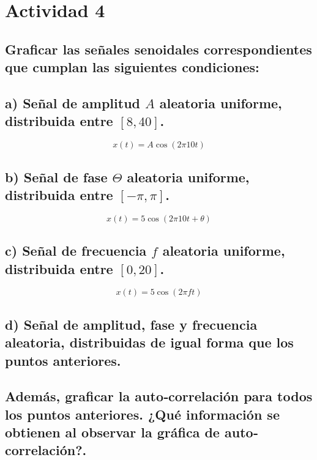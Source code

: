 \section{Actividad 4}

\subsection*{Graficar las señales senoidales correspondientes que cumplan las siguientes condiciones:}

\subsection*{a) Señal de amplitud \(A\) aleatoria uniforme, distribuida entre \([8, 40]\).}

    \[
        x(t) = A \cos(2 \pi 10 t)
    \]

\subsection*{b) Señal de fase \(\Theta\) aleatoria uniforme, distribuida entre \([-\pi, \pi]\).}

    \[
        x(t) = 5 \cos(2 \pi 10 t + \theta)
    \]

\subsection*{c) Señal de frecuencia \(f\) aleatoria uniforme, distribuida entre \([0, 20 ]\).}

    \[
        x(t) = 5 \cos(2 \pi f t)
    \]

\subsection*{d) Señal de amplitud, fase y frecuencia aleatoria, distribuidas de igual forma que los
puntos anteriores.}

\subsection*{Además, graficar la auto‐correlación para todos los puntos anteriores. ¿Qué información se obtienen al observar la gráfica de auto‐correlación?.}